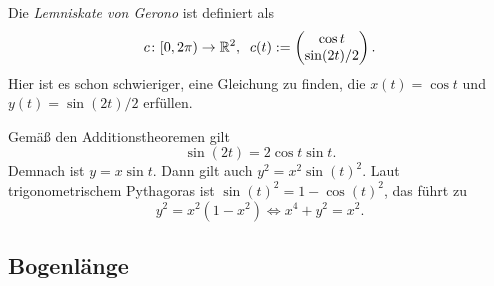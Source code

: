 Die \emph{Lemniskate von Gerono} ist definiert als
\begin{equation}
c\colon{[0,2\pi)}\to\mathbb R^2,\;\;c(t):=\begin{pmatrix}
\cos t\\
\sin(2t)/2
\end{pmatrix}.
\end{equation}
Hier ist es schon schwieriger, eine Gleichung zu finden, die
$x(t)=\cos t$ und $y(t)=\sin(2t)/2$ erfüllen.

Gemäß den Additionstheoremen gilt
\begin{equation}
\sin(2t) = 2\cos t\sin t.
\end{equation}
Demnach ist $y=x\sin t$. Dann gilt auch $y^2=x^2\sin(t)^2$.
Laut trigonometrischem Pythagoras ist $\sin(t)^2=1-\cos(t)^2$,
das führt zu
\begin{equation}
y^2=x^2(1-x^2)\iff x^4+y^2 = x^2.
\end{equation}


\subsection{Bogenlänge}

